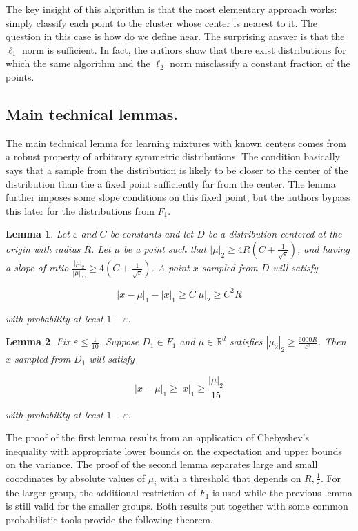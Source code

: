 \documentclass[11pt,letter]{article}
\newtheorem{lemma}{Lemma}
\begin{document}
The key insight of this algorithm is that the most elementary approach works: simply classify each point to the cluster whose center is nearest to it. The question in this case is how do we define near. The surprising answer is that the $\ell_1$ norm is sufficient. In fact, the authors show that there exist distributions for which the same algorithm and the $\ell_2$ norm misclassify a constant fraction of the points. 

\subsection{Main technical lemmas.}

The main technical lemma for learning mixtures with known centers comes from a robust property of arbitrary symmetric distributions. The condition basically says that a sample from the distribution is likely to be closer to the center of the distribution than the a fixed point sufficiently far from the center. The lemma further imposes some slope conditions on this fixed point, but the authors bypass this later for the distributions from $F_1$. 

\begin{lemma}
Let $\varepsilon$ and $C$ be constants and let $D$ be a distribution centered at the origin with radius $R$. Let $\mu$ be a point such that $|\mu|_2 \geq 4R(C+\frac{1}{\sqrt{\varepsilon}})$, and having a slope of ratio $\frac{|\mu|_2}{|\mu|_\infty} \geq 4(C+\frac{1}{\sqrt{\varepsilon}})$. A point $x$ sampled from $D$ will satisfy 

\begin{equation*}
|x-\mu|_1 - |x|_1 \geq C|\mu|_2 \geq C^2R 
\end{equation*}

with probability at least $1-\varepsilon$. 
 
\end{lemma} 

\begin{lemma}
Fix $\varepsilon \leq \frac{1}{10}$. Suppose $D_1 \in F_1$ and $\mu \in \mathbb{R}^d$ satisfies $|\mu_2|_2 \geq \frac{6000R}{\varepsilon^2}$. Then $x$ sampled from $D_1$ will satisfy 

$$|x - \mu|_1 \geq |x|_1 \geq \frac{|\mu|_2}{15}$$

with probability at least $1-\varepsilon$. 
\end{lemma} 

The proof of the first lemma results from an application of Chebyshev's inequality with appropriate lower bounds on the expectation and upper bounds on the variance. The proof of the second lemma separates large and small coordinates by absolute values of $\mu_i$ with a threshold that depends on $R, \frac{1}{\varepsilon}$. For the larger group, the additional restriction of $F_1$ is used while the previous lemma is still valid for the smaller groups. Both results put together with some common probabilistic tools provide the following theorem. 
\end{document}
